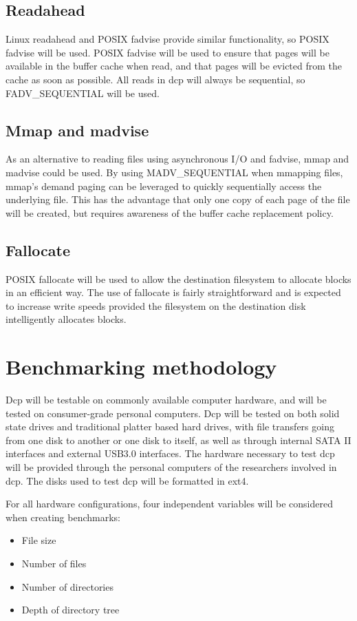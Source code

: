 \documentclass[12pt]{article}
\begin{document}
\subsection{Readahead}
Linux readahead and POSIX fadvise provide similar functionality,
so POSIX fadvise will be used.
POSIX fadvise will be used to ensure that pages will be available
in the buffer cache when read, and that pages will be evicted from
the cache as soon as possible. All reads in dcp will
always be sequential, so FADV\_SEQUENTIAL will be used.

\subsection{Mmap and madvise}
As an alternative to reading files using asynchronous I/O and fadvise,
mmap and madvise could be used. By using MADV\_SEQUENTIAL when mmapping
files, mmap's demand paging can be leveraged to quickly sequentially access
the underlying file. This has the advantage that only one copy of each
page of the file will be created, but requires awareness of the buffer
cache replacement policy.

\subsection{Fallocate}
POSIX fallocate will be used to allow the destination filesystem to
allocate blocks in an efficient way. The use of fallocate is
fairly straightforward and is expected to increase write speeds
provided the filesystem on the destination disk intelligently
allocates blocks.

\section{Benchmarking methodology}
Dcp will be testable on commonly available computer hardware, and will be tested on
consumer-grade personal computers. Dcp will be tested on both solid state drives
and traditional platter based hard drives, with file transfers going from one disk to
another or one disk to itself, as well as through internal SATA II interfaces and
external USB3.0 interfaces. The hardware necessary to test dcp will be provided through
the personal computers of the researchers involved in dcp. The disks used to test dcp
will be formatted in ext4.

For all hardware configurations, four independent variables will be considered when
creating benchmarks:
\begin{itemize}
    \item File size
    \item Number of files
    \item Number of directories
    \item Depth of directory tree
\end{itemize}
\end{document}

